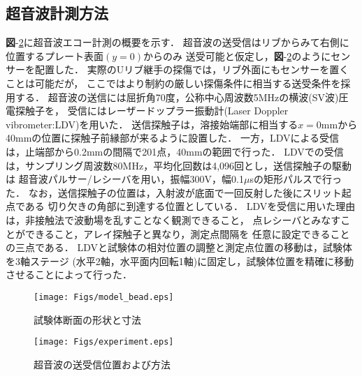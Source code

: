 \subsection{超音波計測方法}
{\bf 図}-\ref{fig:experiment}に超音波エコー計測の概要を示す．
超音波の送受信はリブからみて右側に位置するプレート表面$(y=0)$からのみ
送受可能と仮定し，{\bf 図}-\ref{fig:experiment}のようにセンサーを配置した．
実際のUリブ継手の探傷では，リブ外面にもセンサーを置くことは可能だが，
ここではより制約の厳しい探傷条件に相当する送受条件を採用する．
超音波の送信には屈折角70度，公称中心周波数5MHzの横波(SV波)圧電探触子を，
受信にはレーザードップラー振動計(Laser Doppler vibrometer:LDV)を用いた．
送信探触子は，溶接始端部に相当する$x=0$mmから40mmの位置に探触子前縁部が来るように設置した．
一方，LDVによる受信は，止端部から0.2mmの間隔で201点，40mmの範囲で行った．
LDVでの受信は，サンプリング周波数80MHz，平均化回数は4,096回とし，送信探触子の駆動は
超音波パルサー/レシーバを用い，振幅300V，幅0.1$\mu$sの矩形パルスで行った．
なお，送信探触子の位置は，入射波が底面で一回反射した後にスリット起点である
切り欠きの角部に到達する位置としている．
LDVを受信に用いた理由は，非接触法で波動場を乱すことなく観測できること，
点レシーバとみなすことができること，アレイ探触子と異なり，測定点間隔を
任意に設定できることの三点である．
LDVと試験体の相対位置の調整と測定点位置の移動は，試験体を3軸ステージ
(水平2軸，水平面内回転1軸)に固定し，試験体位置を精確に移動させることによって行った．
\begin{figure}[htb]
\centering
	\texttt{[image: Figs/model\_bead.eps]}
	\caption{試験体断面の形状と寸法}
	\label{fig:model}
\end{figure}
\begin{figure}[htb]
\centering
	\texttt{[image: Figs/experiment.eps]}
	\caption{超音波の送受信位置および方法}
	\label{fig:experiment}
\end{figure}
